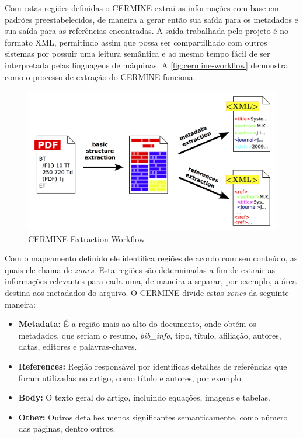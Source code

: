 Com estas regiões definidas o CERMINE extrai as informações com base em padrões preestabelecidos, de maneira a gerar então sua saída para os metadados e sua saída para as referências encontradas. A saída trabalhada pelo projeto é no formato XML, permitindo assim que possa ser compartilhado com outros sistemas por possuir uma leitura semântica e ao mesmo tempo fácil de ser interpretada pelas linguagens de máquinas. A \autoref{fig:cermine-workflow} demonstra como o processo de extração do CERMINE funciona.

\begin{figure}
    \centering
    \caption{CERMINE Extraction Workflow}
    \label{fig:cermine-workflow}
    \includegraphics[width=0.7\linewidth]{./assets/images/cermine}
\end{figure}

Com o mapeamento definido ele identifica regiões de acordo com seu conteúdo, as quais ele chama de \textit{zones}. Esta regiões são determinadas a fim de extrair as informações relevantes para cada uma, de maneira a separar, por exemplo, a área destina aos metadados do arquivo. O CERMINE divide estas \textit{zones} da seguinte maneira:

\begin{itemize}
    \item \textbf{Metadata:} É a região mais ao alto do documento, onde obtém os metadados, que seriam o resumo, \textit{bib\_info}, tipo, título, afiliação, autores, datas, editores e palavras-chaves.
    \item \textbf{References:} Região responsável por identificas detalhes de referências que foram utilizadas no artigo, como título e autores, por exemplo
    \item \textbf{Body:} O texto geral do artigo, incluindo equações, imagens e tabelas.
    \item \textbf{Other:} Outros detalhes menos significantes semanticamente, como número das páginas, dentro outros.
\end{itemize}

